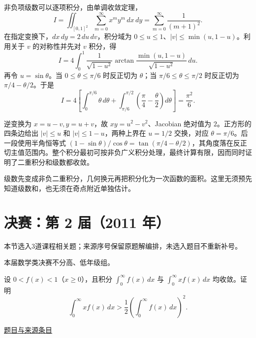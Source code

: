 \documentclass[UTF8,12pt,a4paper,fontset=fandol]{ctexart}
\begin{document}
\begin{solve}\label{ans:fin01-all:8}

非负项级数可以逐项积分，由单调收敛定理，
\[
I=\iint_{[0,1]^2}\sum_{m=0}^\infty x^my^m\,dx\,dy
=\sum_{m=0}^\infty\frac1{(m+1)^2}.
\]
在指定变换下，$dx\,dy=2\,du\,dv$，积分域为
$0\le u\le1$、$|v|\le\min(u,1-u)$。利用关于 $v$ 的对称性并先对 $v$ 积分，得
\[
I=4\int_0^1\frac1{\sqrt{1-u^2}}
\arctan\frac{\min(u,1-u)}{\sqrt{1-u^2}}\,du.
\]
再令 $u=\sin\theta$。当 $0\le\theta\le\pi/6$ 时反正切为 $\theta$；当 $\pi/6\le\theta\le\pi/2$ 时反正切为 $\pi/4-\theta/2$。于是
\[
I=4\left[\int_0^{\pi/6}\theta\,d\theta
+\int_{\pi/6}^{\pi/2}\left(\frac\pi4-\frac\theta2\right)d\theta\right]
=\frac{\pi^2}{6}.
\]

逆变换为 $x=u-v,y=u+v$，故 $xy=u^2-v^2$、Jacobian 绝对值为 $2$。正方形的四条边给出 $|v|\le u$ 和 $|v|\le1-u$，两种上界在 $u=1/2$ 交换，对应 $\theta=\pi/6$。后一段使用半角恒等式 $(1-\sin\theta)/\cos\theta=\tan(\pi/4-\theta/2)$，其角度落在反正切主值范围内。整个积分最初可按非负广义积分处理，最终计算有限，因而同时证明了二重积分和级数都收敛。

\end{solve}

\begin{remark}[方法与条件]级数先变成非负二重积分，几何换元再把积分化为一次函数的面积。这里无须预先知道级数和，也无须在奇点附近单独估计。\end{remark}

\section{决赛：第 2 届（2011 年）}

本节选入3道课程相关题；来源序号保留原题解编排，未选入题目不重新补号。

\begin{remark}[来源说明]本届数学类决赛不分高、低年级组。\end{remark}

\begin{example}[来源序号2]\label{ex:fin02-all:2}\label{pr:fin02-all:2}

设 $0<f(x)<1$（$x\ge0$），且积分 $\int_0^\infty f(x)\,dx$ 与 $\int_0^\infty xf(x)\,dx$ 均收敛。证明
\[
\int_0^\infty xf(x)\,dx>
\frac12\left(\int_0^\infty f(x)\,dx\right)^2.
\]

\par\href{https://github.com/lzxcr/cmc-mathematics/blob/64916fa1fdbc3e444a652eca204d5669058ee321/src/problems/finals/02/02.md}{题目与来源条目}

\end{example}
\end{document}
